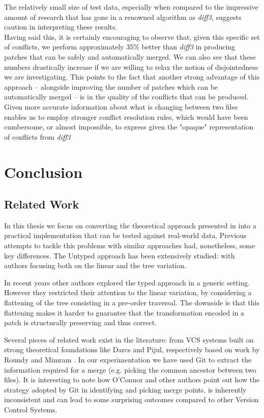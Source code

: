 \documentclass[11pt, titlepage]{article}
\newcommand{\diffthree}{\emph{diff3}\xspace}
\begin{document}
The relatively small size of test data, especially when compared to the impressive amount of research that has gone in a renowned algorithm as \emph{diff3}, suggests caution in interpreting these results. \\
Having said this, it is certainly encouraging to observe that, given this specific set of conflicts, we perform approximately 35\% better than \diffthree in producing patches that can be safely and automatically merged. We can also see that these numbers drastically increase if we are willing to relax the notion of disjointedness we are investigating. This points to the fact that another strong advantage of this approach -- alongside improving the number of patches which can be automatically merged -- is in the quality of the conflicts that can be produced. Given more accurate information about what is changing between two files enables us to employ stronger conflict resolution rules, which would have been cumbersome, or almost impossible, to express given the "opaque" representation of conflicts from \diffthree
\section{Conclusion}

\subsection{Related Work}\label{rel-work}
In this thesis we focus on converting the theoretical approach presented in \cite{type-directed-diff} into a practical implementation that can be tested against real-world data. Previous attempts to tackle this problems with similar approaches had, nonetheless, some key differences. 
The Untyped approach has been extensively studied: with authors focusing both on the linear \cite{diff, bergroth} and the tree \cite{Akutsu, klein,demanie, billie, autexier, chawalthe} variation. 

In recent years other authors explored the typed approach \cite{Vassena, Lempsink} in a generic setting. However they restricted their attention to the linear variation, by considering a flattening of the tree consisting in a pre-order traversal. The downside is that this flattening makes it harder to guarantee that the transformation encoded in a patch is structurally preserving and thus correct.

Several pieces of related work exist in the literature: from VCS systems built on strong theoretical foundations like Darcs and Pijul, respectively based on work by Roundy \cite{darcs} and Mimram \cite{cat-of-patches}. In our experimentation we have used Git to extract the information required for a merge (e.g. picking the common ancestor between two files). It is interesting to note how O'Connor \cite{git-inconsistent} and other authors point out how the strategy adopted by Git in identifying and picking merge points, is inherently inconsistent and can lead to some surprising outcomes compared to other Version Control Systems.
\end{document}
